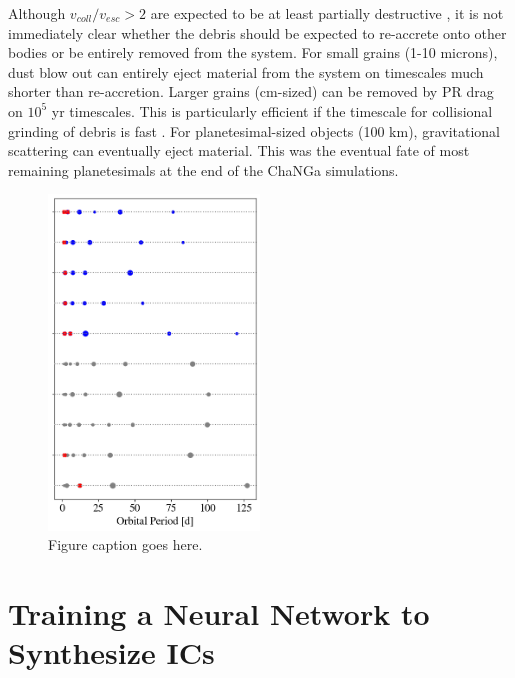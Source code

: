 Although $v_{coll}/v_{esc} > 2$ are expected to be at least partially destructive \cite{marcus09}, it is not immediately clear whether the debris should be expected to re-accrete onto other bodies or be entirely removed from the system. For small grains (1-10 microns), dust blow out can entirely eject material from the system on timescales much shorter than re-accretion. Larger grains (cm-sized) can be removed by PR drag on $10^{5}$ yr timescales. This is particularly efficient if the timescale for collisional grinding of debris is fast \cite{melis12}. For planetesimal-sized objects (100 km), gravitational scattering can eventually eject material. This was the eventual fate of most remaining planetesimals at the end of the {\sc ChaNGa} simulations.

\begin{figure}
\begin{center}
    \includegraphics[width=0.5\textwidth]{figures/stip/architectures_iso_comp.png}
    \caption{Figure caption goes here.\label{fig:architectures_iso_comp}}
\end{center}
\end{figure}

\section{Training a Neural Network to Synthesize ICs} \label{sec:neuralICs}

